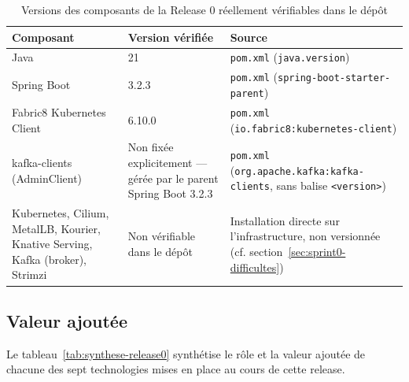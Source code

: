 \begin{table}[!ht]
\begin{center}
     \begin{tabular}{|l{4cm}|l{3cm}|l{6cm}|}
     \hline
     \textbf{Composant} & \textbf{Version vérifiée} & \textbf{Source} \\
     \hline
     Java & 21 & \texttt{pom.xml} (\texttt{java.version}) \\
     \hline
     Spring Boot & 3.2.3 & \texttt{pom.xml} (\texttt{spring-boot-starter-parent}) \\
     \hline
     Fabric8 Kubernetes Client & 6.10.0 & \texttt{pom.xml} (\texttt{io.fabric8:kubernetes-client}) \\
     \hline
     kafka-clients (AdminClient) & Non fixée explicitement — gérée par le parent Spring Boot 3.2.3 & \texttt{pom.xml} (\texttt{org.apache.kafka:kafka-clients}, sans balise \texttt{<version>}) \\
     \hline
     Kubernetes, Cilium, MetalLB, Kourier, Knative Serving, Kafka (broker), Strimzi & Non vérifiable dans le dépôt & Installation directe sur l'infrastructure, non versionnée (cf. section~\ref{sec:sprint0-difficultes}) \\
     \hline
     \end{tabular}
     \caption{Versions des composants de la Release 0 réellement vérifiables dans le dépôt}
     \label{tab:versions-release0}
     \end{center}
\end{table}

\subsection{Valeur ajoutée}

Le tableau~\ref{tab:synthese-release0} synthétise le rôle et la valeur ajoutée de chacune des sept technologies mises en place au cours de cette release.

